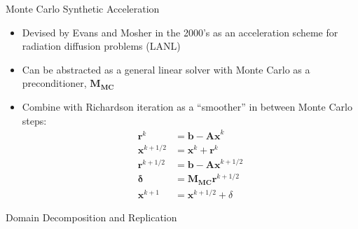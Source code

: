 \documentclass{beamer}
\begin{document}
\begin{frame}{Monte Carlo Synthetic Acceleration}
  \begin{itemize}
  \item Devised by Evans and Mosher in the 2000's as an acceleration
    scheme for radiation diffusion problems (LANL)
    \vfill
  \item Can be abstracted as a general linear solver with Monte Carlo as a
    preconditioner, $\mathbf{M_{MC}}$
    \vfill
  \item Combine with Richardson iteration as a ``smoother'' in between
    Monte Carlo steps:
    \begin{align*}
      \mathbf{r}^k &= \mathbf{b} - \mathbf{Ax}^k \\
      \mathbf{x}^{k+1/2} &= \mathbf{x}^k + \mathbf{r}^k \\
      \mathbf{r}^{k+1/2} &= \mathbf{b} - \mathbf{Ax}^{k+1/2} \\
      \mathbf{\delta} &= \mathbf{M_{MC}} \mathbf{r}^{k+1/2} \\
      \mathbf{x}^{k+1} &= \mathbf{x}^{k+1/2} + \delta
    \end{align*}
  \end{itemize}
\end{frame}

\begin{frame}

  \center Domain Decomposition and Replication
  
\end{frame}
\end{document}
